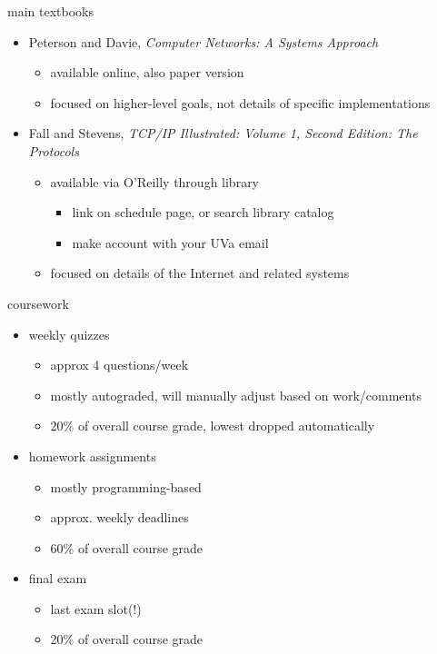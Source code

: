 \date{}
\title{}
\date{}

\begin{frame}
    \titlepage
\end{frame}

\begin{frame}{main textbooks}
    \begin{itemize}
    \item Peterson and Davie, \textit{Computer Networks:  A Systems Approach}
        \begin{itemize}
        \item available online, also paper version
        \item focused on higher-level goals, not details of specific implementations
        \end{itemize}
    \item Fall and Stevens, \textit{TCP/IP Illustrated: Volume 1, Second Edition: The Protocols}
        \begin{itemize}
        \item available via O'Reilly through library
            \begin{itemize}
            \item link on schedule page, or search library catalog
            \item make account with your UVa email
            \end{itemize}
        \item focused on details of the Internet and related systems
        \end{itemize}
    \end{itemize}
\end{frame}

\begin{frame}{coursework}
    \begin{itemize}
    \item weekly quizzes
        \begin{itemize}
        \item approx 4 questions/week
        \item mostly autograded, will manually adjust based on work/comments
        \item 20\% of overall course grade, lowest dropped automatically
        \end{itemize}
    \item homework assignments
        \begin{itemize}
        \item mostly programming-based
        \item approx. weekly deadlines
        \item 60\% of overall course grade
        \end{itemize}
    \item final exam
        \begin{itemize}
        \item last exam slot(!)
        \item 20\% of overall course grade
        \end{itemize}
    \end{itemize}
\end{frame}

